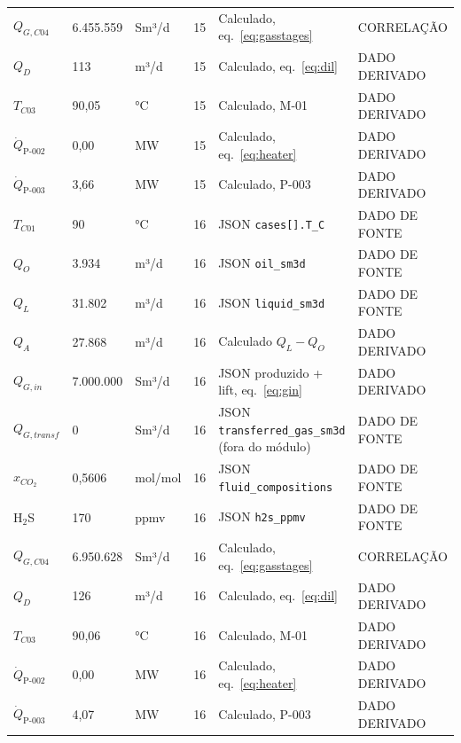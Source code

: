 \documentclass[11pt,a4paper]{article}
\numberwithin{equation}{section}
\numberwithin{table}{section}
\numberwithin{figure}{section}
\newcommand{\tipo}[1]{\textsf{\footnotesize #1}}
\begin{document}
{\begin{longtable}{L{3.6cm}L{2.2cm}lL{1.0cm}L{4.2cm}l}
$Q_{G,C04}$ & 6.455.559 & Sm³/d & 15 & Calculado, eq.~\eqref{eq:gasstages} & \tipo{CORRELAÇÃO}\\
$Q_{D}$ & 113 & m³/d & 15 & Calculado, eq.~\eqref{eq:dil} & \tipo{DADO DERIVADO}\\
$T_{C03}$ & 90,05 & °C & 15 & Calculado, M-01 & \tipo{DADO DERIVADO}\\
$\dot Q_{\mbox{P-002}}$ & 0,00 & MW & 15 & Calculado, eq.~\eqref{eq:heater} & \tipo{DADO DERIVADO}\\
$\dot Q_{\mbox{P-003}}$ & 3,66 & MW & 15 & Calculado, P-003 & \tipo{DADO DERIVADO}\\
$T_{C01}$ & 90 & °C & 16 & JSON \texttt{cases[].T\_C} & \tipo{DADO DE FONTE}\\
$Q_{O}$ & 3.934 & m³/d & 16 & JSON \texttt{oil\_sm3d} & \tipo{DADO DE FONTE}\\
$Q_{L}$ & 31.802 & m³/d & 16 & JSON \texttt{liquid\_sm3d} & \tipo{DADO DE FONTE}\\
$Q_{A}$ & 27.868 & m³/d & 16 & Calculado $Q_L-Q_O$ & \tipo{DADO DERIVADO}\\
$Q_{G,in}$ & 7.000.000 & Sm³/d & 16 & JSON produzido + lift, eq.~\eqref{eq:gin} & \tipo{DADO DERIVADO}\\
$Q_{G,transf}$ & 0 & Sm³/d & 16 & JSON \texttt{transferred\_gas\_sm3d} (fora do módulo) & \tipo{DADO DE FONTE}\\
$x_{CO_2}$ & 0{,}5606 & mol/mol & 16 & JSON \texttt{fluid\_compositions} & \tipo{DADO DE FONTE}\\
H$_2$S & 170 & ppmv & 16 & JSON \texttt{h2s\_ppmv} & \tipo{DADO DE FONTE}\\
$Q_{G,C04}$ & 6.950.628 & Sm³/d & 16 & Calculado, eq.~\eqref{eq:gasstages} & \tipo{CORRELAÇÃO}\\
$Q_{D}$ & 126 & m³/d & 16 & Calculado, eq.~\eqref{eq:dil} & \tipo{DADO DERIVADO}\\
$T_{C03}$ & 90,06 & °C & 16 & Calculado, M-01 & \tipo{DADO DERIVADO}\\
$\dot Q_{\mbox{P-002}}$ & 0,00 & MW & 16 & Calculado, eq.~\eqref{eq:heater} & \tipo{DADO DERIVADO}\\
$\dot Q_{\mbox{P-003}}$ & 4,07 & MW & 16 & Calculado, P-003 & \tipo{DADO DERIVADO}\\
\bottomrule\end{longtable}}
\end{document}
